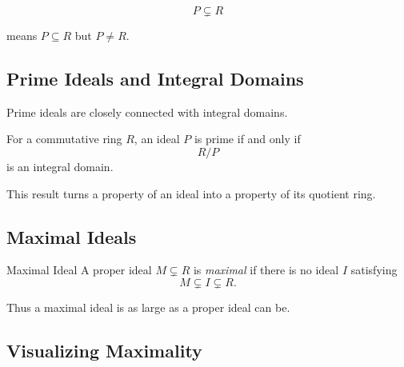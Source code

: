 \[ P\subsetneq R \]

means \(P\subseteq R\) but \(P\neq R\).

\subsection{Prime Ideals and Integral Domains}
\label{subsec:prime-ideal-domain}

Prime ideals are closely connected with integral domains.

\begin{theorem}
For a commutative ring \(R\), an ideal \(P\) is prime if and only if
\[ R/P \]
is an integral domain.
\end{theorem}

This result turns a property of an ideal into a property of its quotient ring.

\subsection{Maximal Ideals}
\label{subsec:maximal-ideals}

\begin{definitionbox}{Maximal Ideal}
A proper ideal \(M\subsetneq R\) is \emph{maximal} if there is no ideal \(I\)
satisfying
\[ M\subsetneq I\subsetneq R. \]
\end{definitionbox}

Thus a maximal ideal is as large as a proper ideal can be.

\subsection{Visualizing Maximality}
\label{subsec:visual-maximal-ideal}

\begin{center}
\end{center}

